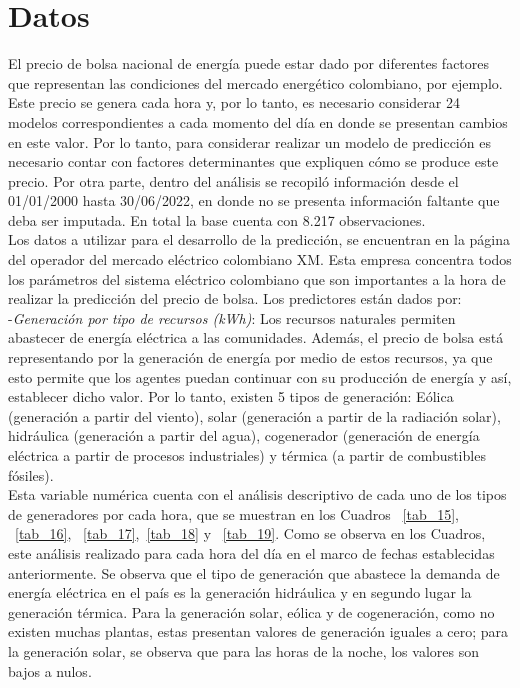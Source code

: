 \documentclass[conference, 10pt]{IEEEtran}
\begin{document}
\section{Datos} \label{AA}

El precio de bolsa nacional de energía puede estar dado por diferentes factores que representan las condiciones del mercado energético colombiano, por ejemplo. Este precio se genera cada hora y, por lo tanto, es necesario considerar 24 modelos correspondientes a cada momento del día en donde se presentan cambios en este valor. Por lo tanto, para considerar realizar un modelo de predicción es necesario contar con factores determinantes que expliquen cómo se produce este precio. Por otra parte, dentro del análisis se recopiló información desde el 01/01/2000 hasta 30/06/2022, en donde no se presenta información faltante que deba ser imputada. En total la base cuenta con 8.217 observaciones.\\ 
Los datos a utilizar para el desarrollo de la predicción, se encuentran en la página del operador del mercado eléctrico colombiano XM. Esta empresa concentra todos los parámetros del sistema eléctrico colombiano que son importantes a la hora de realizar la predicción del precio de bolsa. Los predictores están dados por:\\
-\textit{Generación por tipo de recursos (kWh)}: Los recursos naturales permiten abastecer de energía eléctrica a las comunidades. Además, el precio de bolsa está representando por la generación de energía por medio de estos recursos, ya que esto permite que los agentes puedan continuar con su producción de energía y así, establecer dicho valor. Por lo tanto, existen 5 tipos de generación: Eólica (generación a partir del viento), solar (generación a partir de la radiación solar), hidráulica (generación a partir del agua), cogenerador (generación de energía eléctrica a partir de procesos industriales) y térmica (a partir de combustibles fósiles).\\
Esta variable numérica cuenta con el análisis descriptivo  de cada uno de los tipos de generadores por cada hora, que se muestran en los Cuadros ~\ref{tab_15}, ~\ref{tab_16}, ~\ref{tab_17},~\ref{tab_18} y ~\ref{tab_19}. Como se observa en los Cuadros, este análisis realizado para cada hora del día en el marco de fechas establecidas anteriormente. Se observa que el tipo de generación que abastece la demanda de energía eléctrica en el país es la generación hidráulica y en segundo lugar la generación térmica. Para la generación solar, eólica y de cogeneración, como no existen muchas plantas, estas presentan valores de generación iguales a cero; para la generación solar, se observa que para las horas de la noche, los valores son bajos a nulos.
\end{document}
